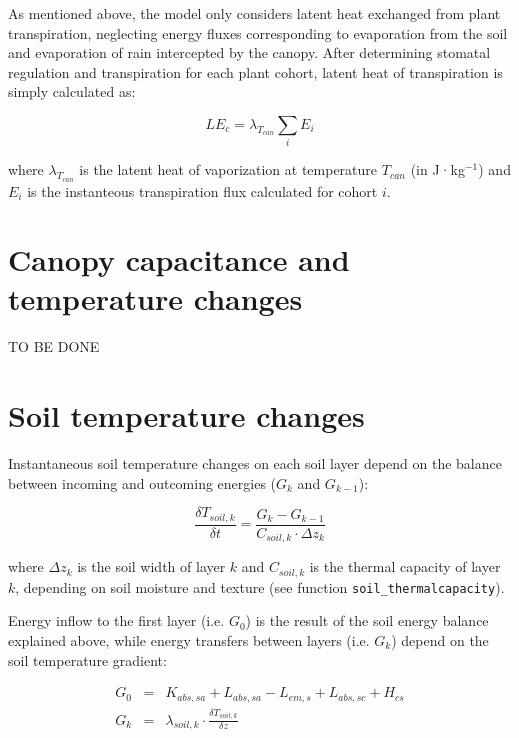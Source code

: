\documentclass[]{book}
\begin{document}
As mentioned above, the model only considers latent heat exchanged from
plant transpiration, neglecting energy fluxes corresponding to
evaporation from the soil and evaporation of rain intercepted by the
canopy. After determining stomatal regulation and transpiration for each
plant cohort, latent heat of transpiration is simply calculated as:

\begin{equation}
LE_{c} = \lambda_{T_{can}} \sum_{i}{E_i}
\end{equation}

where \(\lambda_{T_{can}}\) is the latent heat of vaporization at
temperature \(T_{can}\) (in J·kg\(^{-1}\)) and \(E_i\) is the
instanteous transpiration flux calculated for cohort \(i\).

\section{Canopy capacitance and temperature
changes}\label{canopy-capacitance-and-temperature-changes}

TO BE DONE

\section{Soil temperature changes}\label{soil-temperature-changes}

Instantaneous soil temperature changes on each soil layer depend on the
balance between incoming and outcoming energies (\(G_k\) and
\(G_{k-1}\)):

\begin{equation}
\frac{\delta T_{soil,k}}{\delta t} = \frac{G_k - G_{k-1}}{C_{soil,k} \cdot \Delta z_k}
\end{equation}

where \(\Delta z_k\) is the soil width of layer \(k\) and \(C_{soil,k}\)
is the thermal capacity of layer \(k\), depending on soil moisture and
texture (see function \texttt{soil\_thermalcapacity}).

Energy inflow to the first layer (i.e. \(G_0\)) is the result of the
soil energy balance explained above, while energy transfers between
layers (i.e. \(G_k\)) depend on the soil temperature gradient:

\begin{eqnarray}
G_0 &=& K_{abs,sa} + L_{abs,sa} - L_{em,s} + L_{abs,sc} + H_{cs}\\
G_k &=& \lambda_{soil,k} \cdot \frac{\delta T_{soil,k}}{\delta z}
\end{eqnarray}
\end{document}
